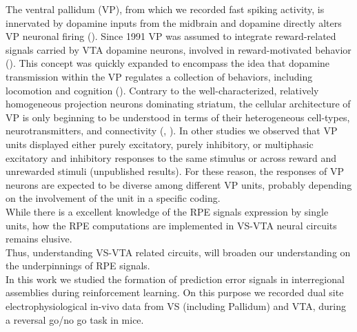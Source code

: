 The ventral pallidum (VP), from which we recorded fast spiking activity, is innervated by dopamine inputs from the midbrain and dopamine directly alters VP neuronal firing (\cite{Napier89}). Since 1991 VP was assumed to integrate reward-related signals carried by VTA dopamine neurons, involved in reward-motivated behavior (\cite{Napier91}). This concept was quickly expanded to encompass the idea that dopamine transmission within the VP regulates a collection of behaviors, including locomotion and cognition (\cite{Napier92}). Contrary to the well-characterized, relatively homogeneous projection neurons dominating striatum, the cellular architecture of VP is only beginning to be understood in terms of their heterogeneous cell-types, neurotransmitters, and connectivity (\cite{Heimer1997}, \cite{Tachibana2012}). In other studies we observed that VP units displayed either purely excitatory, purely inhibitory, or multiphasic excitatory and inhibitory responses to the same stimulus or across reward and unrewarded stimuli (unpublished results). For these reason, the responses of VP neurons are expected to be diverse among different VP units, probably depending on the involvement of the unit in a specific coding.\\While there is a excellent knowledge of the RPE signals expression by single units, how the RPE computations are implemented in VS-VTA neural circuits remains elusive.\\
Thus, understanding VS-VTA related circuits, will broaden our understanding on the underpinnings of RPE signals.\\In this work we studied the formation of prediction error signals in interregional assemblies during reinforcement learning. On this purpose we recorded dual site electrophysiological in-vivo data from VS (including Pallidum) and VTA, during a reversal go/no go task in mice.\\%
